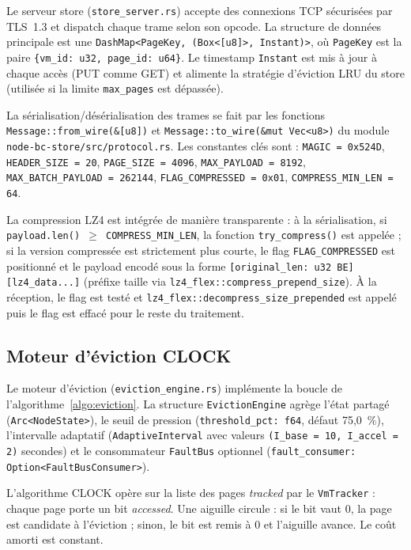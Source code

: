 Le serveur store (\texttt{store\_server.rs}) accepte des connexions TCP sécurisées par TLS~1.3 et dispatch chaque trame selon son opcode. La structure de données principale est une \texttt{DashMap<PageKey, (Box<[u8]>, Instant)>}, où \texttt{PageKey} est la paire \texttt{\{vm\_id: u32, page\_id: u64\}}. Le timestamp \texttt{Instant} est mis à jour à chaque accès (PUT comme GET) et alimente la stratégie d'éviction LRU du store (utilisée si la limite \texttt{max\_pages} est dépassée).

La sérialisation/désérialisation des trames se fait par les fonctions \texttt{Message::from\_wire(\&[u8])} et \texttt{Message::to\_wire(\&mut Vec<u8>)} du module \texttt{node-bc-store/src/protocol.rs}. Les constantes clés sont : \texttt{MAGIC = 0x524D}, \texttt{HEADER\_SIZE = 20}, \texttt{PAGE\_SIZE = 4096}, \texttt{MAX\_PAYLOAD = 8192}, \texttt{MAX\_BATCH\_PAYLOAD = 262144}, \texttt{FLAG\_COMPRESSED = 0x01}, \texttt{COMPRESS\_MIN\_LEN = 64}.

La compression LZ4 est intégrée de manière transparente : à la sérialisation, si \texttt{payload.len() $\ge$ COMPRESS\_MIN\_LEN}, la fonction \texttt{try\_compress()} est appelée ; si la version compressée est strictement plus courte, le flag \texttt{FLAG\_COMPRESSED} est positionné et le payload encodé sous la forme \texttt{[original\_len:~u32 BE][lz4\_data...]} (préfixe taille via \texttt{lz4\_flex::compress\_prepend\_size}). À la réception, le flag est testé et \texttt{lz4\_flex::decompress\_size\_prepended} est appelé puis le flag est effacé pour le reste du traitement.

\subsection{Moteur d'éviction CLOCK}

Le moteur d'éviction (\texttt{eviction\_engine.rs}) implémente la boucle de l'algorithme~\ref{algo:eviction}. La structure \texttt{EvictionEngine} agrège l'état partagé (\texttt{Arc<NodeState>}), le seuil de pression (\texttt{threshold\_pct: f64}, défaut 75,0~\%), l'intervalle adaptatif (\texttt{AdaptiveInterval} avec valeurs \texttt{(I\_base = 10, I\_accel = 2)} secondes) et le consommateur \texttt{FaultBus} optionnel (\texttt{fault\_consumer: Option<FaultBusConsumer>}).

L'algorithme CLOCK opère sur la liste des pages \emph{tracked} par le \texttt{VmTracker} : chaque page porte un bit \emph{accessed}. Une aiguille circule : si le bit vaut 0, la page est candidate à l'éviction ; sinon, le bit est remis à 0 et l'aiguille avance. Le coût amorti est constant.

